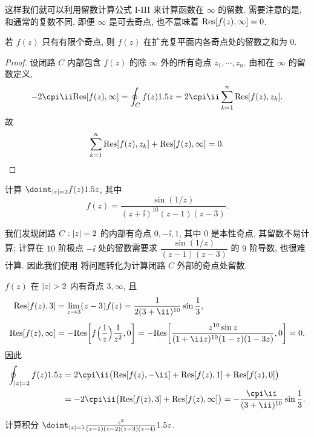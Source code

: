 这样我们就可以利用留数计算公式 I-III 来计算函数在 $\infty$ 的留数.
需要注意的是, 和通常的复数不同, \alert{即便 $\infty$ 是可去奇点, 也不意味着 ${\mathrm{Res}}[f(z),\infty]=0$}.

\begin{theorem}
  \label{thm:sum-of-residues-are-zero}
  若 $f(z)$ 只有有限个奇点, 则 $f(z)$ 在扩充复平面内各奇点处的留数之和为 $0$.
\end{theorem}

\begin{proof}
  设闭路 $C$ 内部包含 $f(z)$ 的除 $\infty$ 外的所有奇点 $z_1,\cdots,z_n$.
  由\thmRes 和在 $\infty$ 的留数定义, 
  \[
     -2\cpi\ii\Res[f(z),\infty]
    =\oint_C f(z)\d z
    =2\cpi\ii\sum_{k=1}^n\Res[f(z),z_k].
  \]
  故
  \[
    \sum_{k=1}^n {\mathrm{Res}}[f(z),z_k]+{\mathrm{Res}}[f(z),\infty]=0.\qedhere
  \]
\end{proof}

\begin{example}
  计算 $\doint_{\abs{z}=2}f(z)\d z$, 其中
  \[
    f(z)=\frac{\sin(1/z)}{(z+\ii)^{10}(z-1)(z-3)}.
  \]
\end{example}

我们发现闭路 $C:\left|z\right|=2$ 的内部有奇点 $0,-\ii,1$, 其中 $0$ 是本性奇点, 其留数不易计算; 计算在 $10$ 阶极点 $-\ii$ 处的留数需要求 $\dfrac{\sin(1/z)}{(z-1)(z-3)}$ 的 $9$ 阶导数, 也很难计算.
因此我们使用 将问题转化为计算闭路 $C$ 外部的奇点处留数.

\begin{solution}
  $f(z)$ 在 $\abs{z}>2$ 内有奇点 $3,\infty$, 且
  \begin{align*}
     \Res[f(z),3]&
    =\lim_{z\ra3}(z-3)f(z)
    =\frac1{2(3+\ii)^{10}}\sin\frac13,\\[4pt]
     \Res[f(z),\infty]&
    =-\Res\biggl[f\Bigl(\frac1z\Bigr)\frac1{z^2},0\biggr]
    =-\Res\biggl[\frac{z^{10}\sin z}{(1+\ii z)^{10}(1-z)(1-3z)},0\biggr]
    =0.
  \end{align*}
  因此
  \begin{align*}
     \oint_{\abs{z}=2}f(z)\d z&
    =2\cpi\ii\bigl(\Res[f(z),-\ii]+\Res[f(z),1]+\Res[f(z),0]\bigr)\\&
    =-2\cpi\ii\bigl(\Res[f(z),3]+\Res[f(z),\infty]\bigr)
    =-\frac{\cpi\ii}{(3+\ii)^{10}}\sin\frac13.
  \end{align*}
\end{solution}

\begin{exercise}
  计算积分 $\doint_{\abs{z}=5}\frac{z^3}{(z-1)(z-2)(z-3)(z-4)}\d z$.
\end{exercise}

